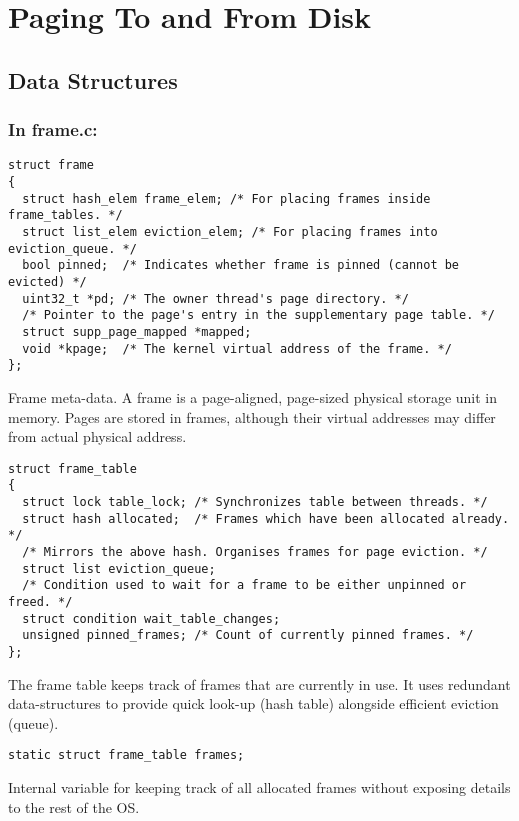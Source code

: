 
\section{Paging To and From Disk}

\subsection{Data Structures}



\subsubsection*{In frame.c:}

\begin{verbatim}
struct frame
{
  struct hash_elem frame_elem; /* For placing frames inside frame_tables. */
  struct list_elem eviction_elem; /* For placing frames into eviction_queue. */
  bool pinned;  /* Indicates whether frame is pinned (cannot be evicted) */
  uint32_t *pd; /* The owner thread's page directory. */
  /* Pointer to the page's entry in the supplementary page table. */
  struct supp_page_mapped *mapped;
  void *kpage;  /* The kernel virtual address of the frame. */
};
\end{verbatim}
Frame meta-data.
A frame is a page-aligned, page-sized physical storage unit in memory.
Pages are stored in frames, although their virtual addresses may differ from actual physical address.

\begin{verbatim}
struct frame_table
{
  struct lock table_lock; /* Synchronizes table between threads. */
  struct hash allocated;  /* Frames which have been allocated already. */
  /* Mirrors the above hash. Organises frames for page eviction. */
  struct list eviction_queue;
  /* Condition used to wait for a frame to be either unpinned or freed. */
  struct condition wait_table_changes;
  unsigned pinned_frames; /* Count of currently pinned frames. */
};
\end{verbatim}
The frame table keeps track of frames that are currently in use.
It uses redundant data-structures to provide quick look-up (hash table) alongside efficient eviction (queue).


\begin{verbatim}
static struct frame_table frames;
\end{verbatim}
Internal variable for keeping track of all allocated frames without exposing details to the rest of the OS.

